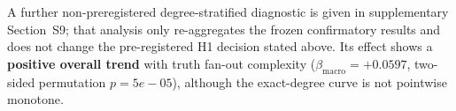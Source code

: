 
A further non-preregistered degree-stratified diagnostic is given in supplementary
Section~S9; that analysis only re-aggregates the frozen confirmatory results and does not
change the pre-registered H1 decision stated above.  Its effect shows a
\textbf{positive overall trend} with truth fan-out complexity
($\beta_{\mathrm{macro}} = +0.0597$, two-sided permutation
$p = 5e-05$), although the exact-degree curve is not pointwise monotone.
